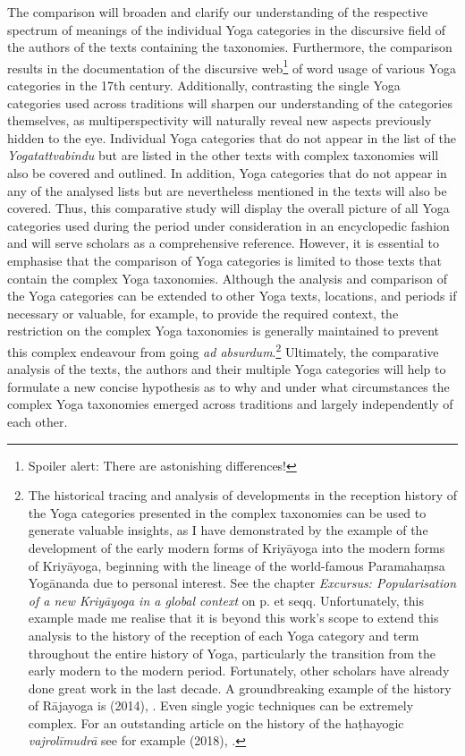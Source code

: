 The comparison will broaden and clarify our understanding of the respective spectrum of meanings of the individual Yoga categories in the discursive field of the authors of the texts containing the taxonomies. Furthermore, the comparison results in the documentation of the discursive web\footnote{Spoiler alert: There are astonishing differences!} of word usage of various Yoga categories in the 17th century. Additionally, contrasting the single Yoga categories used across traditions will sharpen our understanding of the categories themselves, as multiperspectivity will naturally reveal new aspects previously hidden to the eye. Individual Yoga categories that do not appear in the list of the \textit{Yogatattvabindu} but are listed in the other texts with complex taxonomies will also be covered and outlined. In addition, Yoga categories that do not appear in any of the analysed lists but are nevertheless mentioned in the texts will also be covered. Thus, this comparative study will display the overall picture of all Yoga categories used during the period under consideration in an encyclopedic fashion and will serve scholars as a comprehensive reference. However, it is essential to emphasise that the comparison of Yoga categories is limited to those texts that contain the complex Yoga taxonomies. Although the analysis and comparison of the Yoga categories can be extended to other Yoga texts, locations, and periods if necessary or valuable, for example, to provide the required context, the restriction on the complex Yoga taxonomies is generally maintained to prevent this complex endeavour from going \textit{ad absurdum}.\footnote{The historical tracing and analysis of developments in the reception history of the Yoga categories presented in the complex taxonomies can be used to generate valuable insights, as I have demonstrated by the example of the development of the early modern forms of Kriyāyoga into the modern forms of Kriyāyoga, beginning with the lineage of the world-famous Paramahaṃsa Yogānanda due to personal interest. See the chapter \textit{Excursus: Popularisation of a new Kriyāyoga in a global context} on p.\pageref{excursus} et seqq. Unfortunately, this example made me realise that it is beyond this work's scope to extend this analysis to the history of the reception of each Yoga category and term throughout the entire history of Yoga, particularly the transition from the early modern to the modern period. Fortunately, other scholars have already done great work in the last decade. A groundbreaking example of the history of Rājayoga is \citeauthor{birch2014} (2014), . Even single yogic techniques can be extremely complex. For an outstanding article on the history of the haṭhayogic \textit{vajrolīmudrā} see for example \citeauthor{mallinson2018vajrolimudra} (2018), .} Ultimately, the comparative analysis of the texts, the authors and their multiple Yoga categories will help to formulate a new concise hypothesis as to why and under what circumstances the complex Yoga taxonomies emerged across traditions and largely independently of each other.

